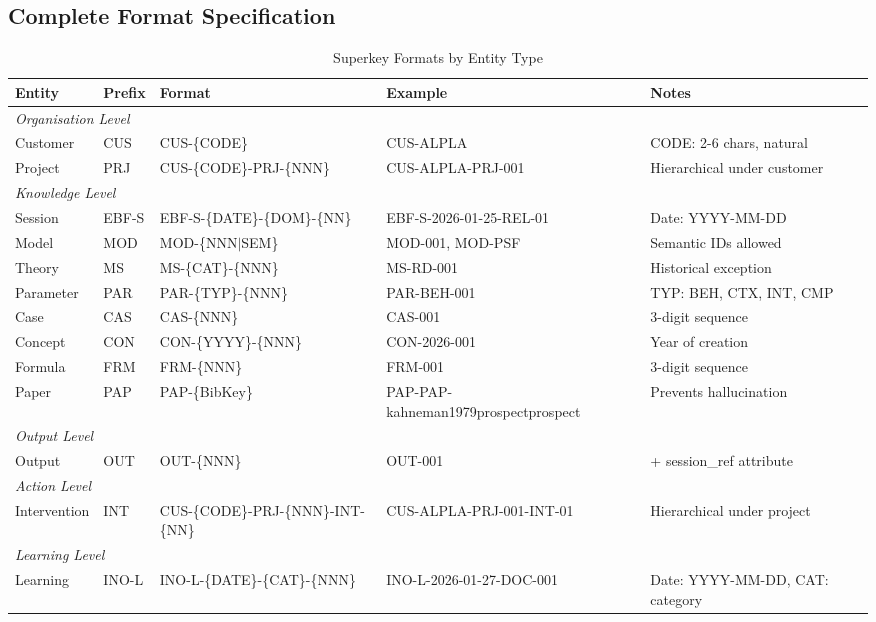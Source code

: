 \subsection{Complete Format Specification}

\begin{table}[htbp]
\centering
\caption{Superkey Formats by Entity Type}
\label{tab:superkey-formats}
\renewcommand{\arraystretch}{1.4}
\begin{tabular}{@{}llllp{3.5cm}@{}}
\toprule
\textbf{Entity} & \textbf{Prefix} & \textbf{Format} & \textbf{Example} & \textbf{Notes} \\
\midrule
\multicolumn{5}{l}{\textit{Organisation Level}} \\
Customer & CUS & CUS-\{CODE\} & CUS-ALPLA & CODE: 2-6 chars, natural \\
Project & PRJ & CUS-\{CODE\}-PRJ-\{NNN\} & CUS-ALPLA-PRJ-001 & Hierarchical under customer \\
\midrule
\multicolumn{5}{l}{\textit{Knowledge Level}} \\
Session & EBF-S & EBF-S-\{DATE\}-\{DOM\}-\{NN\} & EBF-S-2026-01-25-REL-01 & Date: YYYY-MM-DD \\
Model & MOD & MOD-\{NNN$|$SEM\} & MOD-001, MOD-PSF & Semantic IDs allowed \\
Theory & MS & MS-\{CAT\}-\{NNN\} & MS-RD-001 & Historical exception \\
Parameter & PAR & PAR-\{TYP\}-\{NNN\} & PAR-BEH-001 & TYP: BEH, CTX, INT, CMP \\
Case & CAS & CAS-\{NNN\} & CAS-001 & 3-digit sequence \\
Concept & CON & CON-\{YYYY\}-\{NNN\} & CON-2026-001 & Year of creation \\
Formula & FRM & FRM-\{NNN\} & FRM-001 & 3-digit sequence \\
Paper & PAP & PAP-\{BibKey\} & PAP-PAP-kahneman1979prospectprospect & Prevents hallucination \\
\midrule
\multicolumn{5}{l}{\textit{Output Level}} \\
Output & OUT & OUT-\{NNN\} & OUT-001 & + session\_ref attribute \\
\midrule
\multicolumn{5}{l}{\textit{Action Level}} \\
Intervention & INT & CUS-\{CODE\}-PRJ-\{NNN\}-INT-\{NN\} & CUS-ALPLA-PRJ-001-INT-01 & Hierarchical under project \\
\midrule
\multicolumn{5}{l}{\textit{Learning Level}} \\
Learning & INO-L & INO-L-\{DATE\}-\{CAT\}-\{NNN\} & INO-L-2026-01-27-DOC-001 & Date: YYYY-MM-DD, CAT: category \\
\bottomrule
\end{tabular}
\end{table}

